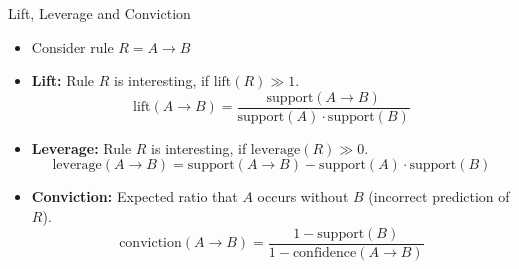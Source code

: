 \begin{dwHeaderFrame}{Lift, Leverage and Conviction}
	\begin{itemize}
		\item Consider rule $R = A \rightarrow B$
		\item \textbf{Lift:} Rule $R$ is interesting, if $\text{lift}(R) \gg 1$.
		\begin{equation}
			\text{lift}(A \rightarrow B) = \frac{\text{support}(A \rightarrow B)}{\text{support}(A) \cdot \text{support}(B)}
		\end{equation}
		\item \textbf{Leverage:} Rule $R$ is interesting, if $\text{leverage}(R) \gg 0$.
		\begin{equation}
			\text{leverage}(A \rightarrow B) = \text{support}(A \rightarrow B) - \text{support}(A) \cdot \text{support}(B)
		\end{equation}
		\item \textbf{Conviction:} Expected ratio that $A$ occurs without $B$ (incorrect prediction of $R$).
		\begin{equation}
			\text{conviction}(A \rightarrow B) = \frac{1 - \text{support}(B)}{1 - \text{confidence}(A \rightarrow B)}
		\end{equation}
	\end{itemize}
\end{dwHeaderFrame}


\makethanks


